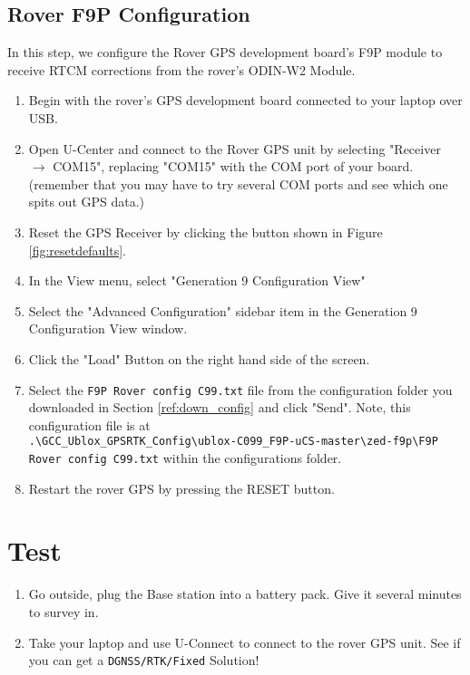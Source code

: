 \documentclass{article}%
\begin{document}
\subsection{Rover F9P Configuration}\label{ref:Rover_f9p_config}

In this step, we configure the Rover GPS development board's F9P module to receive RTCM corrections from the rover's ODIN-W2 Module.

\begin{enumerate}
 
	\item Begin with the rover's GPS development board connected to your laptop over USB.
	\item Open U-Center and connect to the Rover GPS unit by selecting "Receiver $\rightarrow$ COM15", replacing "COM15" with the COM port of your board. (remember that you may have to try several COM ports and see which one spits out GPS data.)
	\item Reset the GPS Receiver by clicking the button shown in Figure \ref{fig:resetdefaults}.
	\item In the View menu, select "Generation 9 Configuration View"
	\item Select the "Advanced Configuration" sidebar item in the Generation 9 Configuration View window.
	\item Click the "Load" Button on the right hand side of the screen.
	\item Select the \texttt{F9P Rover config C99.txt} file from the configuration folder you downloaded in Section \ref{ref:down_config} and click "Send".  Note, this configuration file is at \\ \texttt{.\textbackslash GCC\_Ublox\_GPSRTK\_Config\textbackslash ublox-C099\_F9P-uCS-master\textbackslash zed-f9p\textbackslash F9P Rover config C99.txt} within the configurations folder.
	\item Restart the rover GPS by pressing the RESET button.
\end{enumerate}

\section{Test}
\begin{enumerate}
	\item Go outside, plug the Base station into a battery pack.  Give it several minutes to survey in.
	\item Take your laptop and use U-Connect to connect to the rover GPS unit.  See if you can get a \texttt{DGNSS/RTK/Fixed} Solution!
\end{enumerate}
\end{document}
